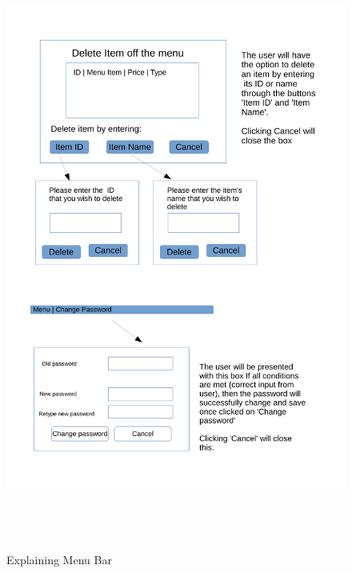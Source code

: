 \begin{figure}[H]
    \includegraphics[height = 20cm]{./Design/Images/InterfaceMenuBar1}
    \caption{Explaining Menu Bar} \label{fig:MenuBar2}
\end{figure}

